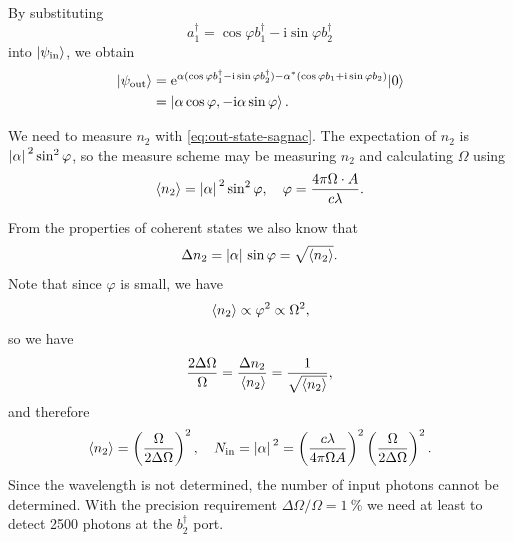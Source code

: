\documentclass[hyperref, a4paper]{article}
\newcommand*{\ii}{\mathrm{i}}
\newcommand*{\ee}{\mathrm{e}}
\begin{document}
\begin{itemize}
\begin{equation}
    \end{equation}
    By substituting
    \[
        a_1^\dagger = \cos \varphi b_1^\dagger - \ii \sin \varphi b_2^\dagger
    \]
    into $\ket{\psi_\text{in}}$, we obtain 
    \begin{equation}
        \begin{aligned}
            \ket{\psi_\text{out}} &= \ee^{\alpha (\cos \varphi b_1^\dagger - \ii \sin \varphi b_2^\dagger) -\alpha^{*} (\cos \varphi b_1 + \ii \sin \varphi b_2)}|0\rangle \\
            &= \ket{\alpha \cos \varphi, - \ii \alpha \sin \varphi} .
        \end{aligned}
        \label{eq:out-state-sagnac}
    \end{equation}
    
    We need to measure $n_2$ with \eqref{eq:out-state-sagnac}.
    The expectation of $n_2$ is $\abs*{\alpha}^2 \sin^2 \varphi$, so the measure scheme may be measuring $n_2$ and calculating $\Omega$ using
    \begin{equation}
        \expval{n_2} = \abs*{\alpha}^2 \sin^2 \varphi , \quad \varphi = \frac{4 \pi \Omega \cdot A}{c \lambda}.
    \end{equation}

    From the properties of coherent states we also know that 
    \begin{equation}
        \Delta n_2 = \abs*{\alpha} \sin \varphi = \sqrt{\expval{n_2}}.
    \end{equation}
    Note that since $\varphi$ is small, we have 
    \[
        \expval*{n_2} \propto \varphi^2 \propto \Omega^2,
    \]
    so we have 
    \[
        \frac{2 \Delta \Omega}{\Omega} = \frac{\Delta n_2}{\expval*{n_2}} = \frac{1}{\sqrt{\expval{n_2}}},
    \]
    and therefore 
    \begin{equation}
        \expval{n_2} = \left( \frac{\Omega}{2 \Delta \Omega} \right)^2, \quad N_\text{in} = \abs*{\alpha}^2 = \left( \frac{c \lambda}{4 \pi \Omega A} \right)^2 \left( \frac{\Omega}{2 \Delta \Omega} \right)^2.
    \end{equation}
    Since the wavelength is not determined, the number of input photons cannot be determined.
    With the precision requirement $\Delta \Omega / \Omega = \SI{1}{\percent}$ we need at least to detect 2500 photons at the $b_2^\dagger$ port.
\end{itemize}

\paragraph{}
\end{document}
